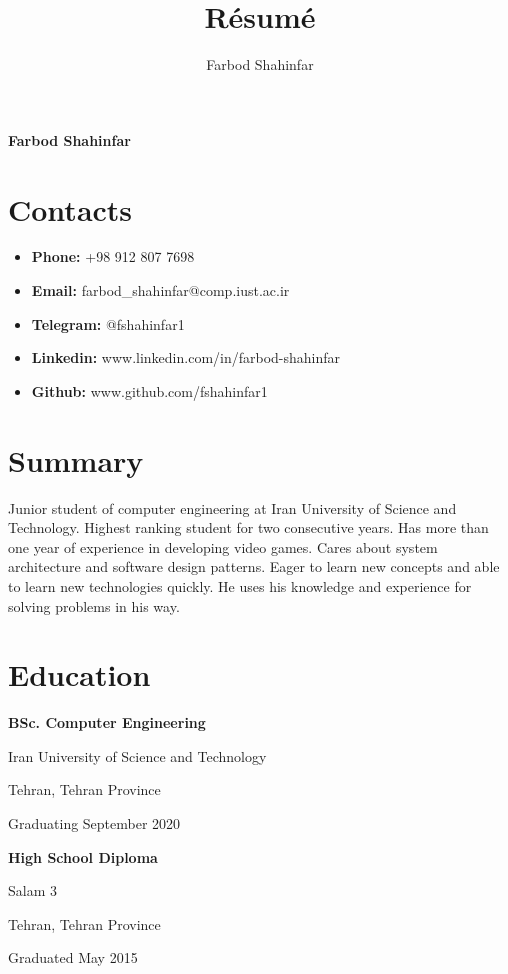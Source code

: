 \documentclass{article}
\begin{document}
\title{R\'esum\'e}
\author{Farbod Shahinfar}

\begin{center}
        {
                \huge\bfseries
                Farbod Shahinfar
        }
\end{center}

\section{Contacts}
\begin{multicols}{2}
\begin{itemize}
        \item{\textbf{Phone:} +98 912 807 7698}
        \item{\textbf{Email:} farbod\_shahinfar@comp.iust.ac.ir}
        \item{\textbf{Telegram:} @fshahinfar1}
        \item{\textbf{Linkedin:} www.linkedin.com/in/farbod-shahinfar}
        \item{\textbf{Github:} www.github.com/fshahinfar1}
\end{itemize}
\end{multicols}

\section{Summary}
Junior student of computer engineering at Iran University of Science and Technology. Highest ranking student for two consecutive years. Has more than one year of experience in developing video games. Cares about system architecture and software design patterns. Eager to learn new concepts and able to learn new technologies quickly. He uses his knowledge and experience for solving problems in his way.

\section{Education}
\begin{multicols}{2}
\noindent \textbf{BSc. Computer Engineering} \par
Iran University of Science and Technology \par
Tehran, Tehran Province \par
Graduating September 2020 \par
\par
\end{multicols}


\begin{multicols}{2}
\noindent \textbf{High School Diploma} \par
Salam 3 \par
Tehran, Tehran Province \par
Graduated May 2015 \par
\par
\end{multicols}
\end{document}
